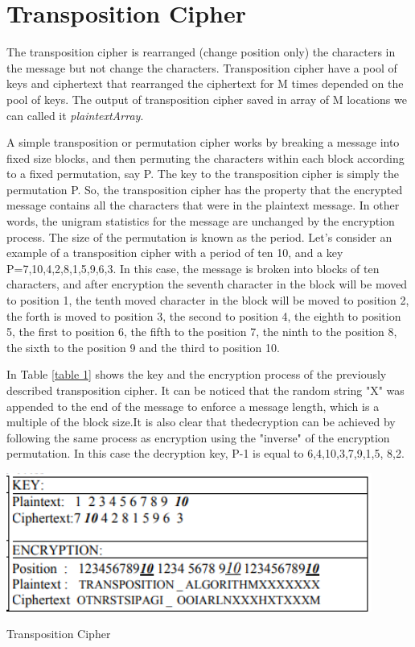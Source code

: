 \section{Transposition Cipher}

The transposition cipher is rearranged (change position only) the characters in the message but not change the characters. Transposition cipher have a pool of keys and ciphertext that rearranged the ciphertext for M times depended on the pool of keys. The output of transposition cipher saved in array of M locations we can called it \textit{plaintextArray}.

A simple transposition or permutation cipher works by breaking a message into fixed size blocks, and then permuting the characters within each block according to a fixed permutation, say P. The key to the transposition cipher is simply the permutation P. So, the transposition cipher has the property that the encrypted message contains all the characters that were in the plaintext message. In other words, the unigram statistics for the message are unchanged by the encryption process. The size of the permutation is known as the period. Let's consider an example of a transposition cipher with a period of ten 10, and a key P={7,10,4,2,8,1,5,9,6,3}. In this case, the message is broken into blocks of ten characters, and after encryption the seventh character in the block will be moved to position 1, the tenth moved character in the block will be moved to position 2, the forth is moved to position 3, the second to position 4, the eighth to position 5, the first to position 6, the fifth to the position 7, the ninth to the position 8, the sixth to the position 9 and the third to position 10.

In Table \ref{table 1} shows the key and the encryption process of the previously described transposition cipher. It can be noticed that the random string "X" was appended to the end of the message to enforce a message length, which is a multiple of the block size.It is also clear that thedecryption can be achieved by following the same process as encryption using the "inverse" of the encryption permutation. In this case the decryption key, P-1 is equal to {6,4,10,3,7,9,1,5, 8,2}.
\begin{table}[h!]
\includegraphics[width=0.9\textwidth]{imagenes/Transposition.png}
\caption{Transposition Cipher}
\label{table:1}
\end{table}